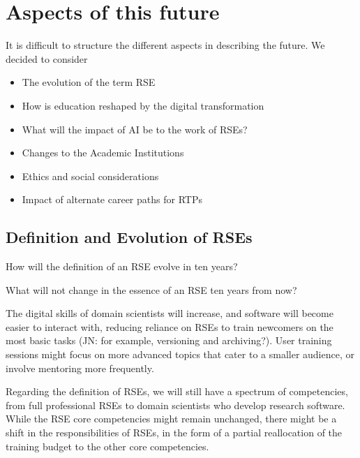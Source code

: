 \documentclass{eceasst}
\begin{document}
\section{Aspects of this future}
It is difficult to structure the different aspects in describing the future. We decided to consider
\begin{itemize}
\item The evolution of the term RSE
\item How is education reshaped by the digital transformation
\item What will the impact of AI be to the work of RSEs?
\item Changes to the Academic Institutions
\item Ethics and social considerations
\item Impact of alternate career paths for RTPs
\end{itemize}


\subsection{Definition and Evolution of RSEs}
\begin{framed}
How will the definition of an RSE evolve in ten years?

What will not change in the essence of an RSE ten years from now?
\end{framed}

The digital skills of domain scientists will increase,
and software will become easier to interact with,
reducing reliance on RSEs to train newcomers on the most basic tasks
(JN: for example, versioning and archiving?).
User training sessions might focus on more advanced topics
that cater to a smaller audience, or involve mentoring more frequently.

Regarding the definition of RSEs, we will still have a spectrum of competencies,
from full professional RSEs to domain scientists who develop research software.
While the RSE core competencies\cite{Goth2024} might remain unchanged,
there might be a shift in the responsibilities of RSEs,
in the form of a partial reallocation of the training budget
to the other core competencies.
\end{document}
